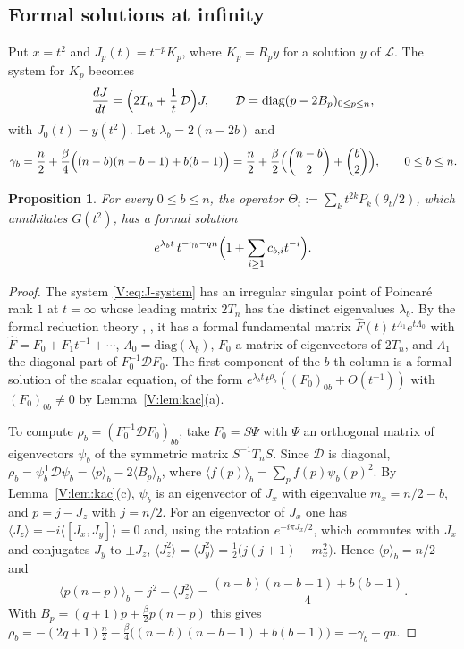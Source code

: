\documentclass[11pt,a4paper]{article}
\newtheorem{proposition}[theorem]{Proposition}
\theoremstyle{definition}
\theoremstyle{remark}
\numberwithin{equation}{section}
\begin{document}
\subsection{Formal solutions at infinity}
Put $x=t^2$ and $J_p(t)=t^{-p}K_p$, where $K_p=R_py$ for a solution $y$ of $\mathcal L$. The system for $K_p$ becomes
\begin{equation}\label{V:eq:J-system}
\frac{dJ}{dt}=\Bigl(2T_n+\frac1t\,\mathcal D\Bigr)J,\qquad\mathcal D=\mathrm{diag}(p-2B_p)_{0\le p\le n},
\end{equation}
with $J_0(t)=y(t^2)$. Let $\lambda_b=2(n-2b)$ and
\begin{equation}\label{V:eq:gamma-b}
\gamma_b=\frac n2+\frac\beta4\Bigl((n-b)(n-b-1)+b(b-1)\Bigr)=\frac n2+\frac\beta2\Bigl(\binom{n-b}2+\binom b2\Bigr),\qquad0\le b\le n.
\end{equation}

\begin{proposition}\label{V:prop:cbe-formal}
For every $0\le b\le n$, the operator $\Theta_t:=\sum_kt^{2k}P_k(\theta_t/2)$, which annihilates $G(t^2)$, has a formal solution
\[
e^{\lambda_bt}\,t^{-\gamma_b-qn}\Bigl(1+\sum_{i\ge1}c_{b,i}t^{-i}\Bigr).
\]
\end{proposition}

\begin{proof}
The system \eqref{V:eq:J-system} has an irregular singular point of Poincar\'e rank $1$ at $t=\infty$ whose leading matrix $2T_n$ has the distinct eigenvalues $\lambda_b$. By the formal reduction theory \cite[Ch.~III]{Was65}, \cite[Ch.~3]{Bal00}, it has a formal fundamental matrix $\hat F(t)\,t^{\Lambda_1}e^{t\Lambda_0}$ with $\hat F=F_0+F_1t^{-1}+\cdots$, $\Lambda_0=\mathrm{diag}(\lambda_b)$, $F_0$ a matrix of eigenvectors of $2T_n$, and $\Lambda_1$ the diagonal part of $F_0^{-1}\mathcal DF_0$. The first component of the $b$-th column is a formal solution of the scalar equation, of the form $e^{\lambda_bt}t^{\rho_b}((F_0)_{0b}+O(t^{-1}))$ with $(F_0)_{0b}\ne0$ by Lemma~\ref{V:lem:kac}(a).

To compute $\rho_b=(F_0^{-1}\mathcal DF_0)_{bb}$, take $F_0=S\Psi$ with $\Psi$ an orthogonal matrix of eigenvectors $\psi_b$ of the symmetric matrix $S^{-1}T_nS$. Since $\mathcal D$ is diagonal, $\rho_b=\psi_b^{\mathsf T}\mathcal D\psi_b=\langle p\rangle_b-2\langle B_p\rangle_b$, where $\langle f(p)\rangle_b=\sum_pf(p)\psi_b(p)^2$. By Lemma~\ref{V:lem:kac}(c), $\psi_b$ is an eigenvector of $J_x$ with eigenvalue $m_x=n/2-b$, and $p=j-J_z$ with $j=n/2$. For an eigenvector of $J_x$ one has $\langle J_z\rangle=-i\langle[J_x,J_y]\rangle=0$ and, using the rotation $e^{-i\pi J_x/2}$, which commutes with $J_x$ and conjugates $J_y$ to $\pm J_z$, $\langle J_z^2\rangle=\langle J_y^2\rangle=\frac12\bigl(j(j+1)-m_x^2\bigr)$. Hence $\langle p\rangle_b=n/2$ and
\[
\langle p(n-p)\rangle_b=j^2-\langle J_z^2\rangle=\frac{(n-b)(n-b-1)+b(b-1)}4 .
\]
With $B_p=(q+1)p+\frac\beta2p(n-p)$ this gives $\rho_b=-(2q+1)\frac n2-\frac\beta4\bigl((n-b)(n-b-1)+b(b-1)\bigr)=-\gamma_b-qn$.
\end{proof}
\end{document}
